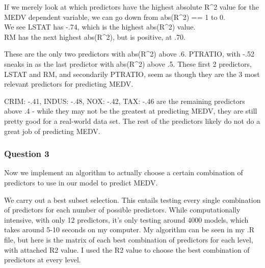 \documentclass[]{article}
\begin{document}
If we merely look at which predictors have the highest absolute R\^{}2
value for the MEDV dependent variable, we can go down from abs(R\^{}2)
== 1 to 0.\\We see LSTAT has -.74, which is the highest abs(R\^{}2)
value.\\RM has the next highest abs(R\^{}2), but is positive, at .70.

These are the only two predictors with abs(R\^{}2) above .6. PTRATIO,
with -.52 sneaks in as the last predictor with abs(R\^{}2) above .5.
These first 2 predictors, LSTAT and RM, and secondarily PTRATIO, seem as
though they are the 3 most relevant predictors for predicting MEDV.

CRIM: -.41, INDUS: -.48, NOX: -.42, TAX: -.46 are the remaining
predictors above .4 - while they may not be the greatest at predicting
MEDV, they are still pretty good for a real-world data set. The rest of
the predictors likely do not do a great job of predicting MEDV.

\subsubsection{Question 3}\label{question-3}

Now we implement an algorithm to actually choose a certain combination
of predictors to use in our model to predict MEDV.

We carry out a best subset selection. This entails testing every single
combination of predictors for each number of possible predictors. While
computationally intensive, with only 12 predictors, it's only testing
around 4000 models, which takes around 5-10 seconds on my computer. My
algorithm can be seen in my .R file, but here is the matrix of each best
combination of predictors for each level, with attached R2 value. I used
the R2 value to choose the best combination of predictors at every
level.
\end{document}
